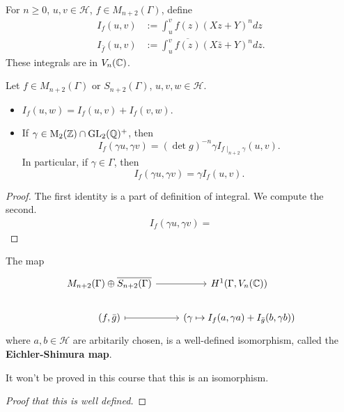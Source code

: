 \begin{definition}
    For $n\ge 0$, $u, v\in \mathcal{H}$, $f\in M_{n+2}(\Gamma)$,
    define \begin{align*}
        I_f(u, v) &:= \int_u^v f(z) (Xz + Y)^n dz\\
        I_{\bar{f}}(u, v) &:=
        \int_u^v \overline{f(z)}(X\bar{z} + Y)^n dz.
    \end{align*}
    These integrals are in $V_n(\mathbb{C})$.
\end{definition}
\begin{lemma}\label{lem: property of If(u v)}
    Let $f\in M_{n+2}(\Gamma)$ or $S_{n+2}(\Gamma)$, $u, v, w\in\mathcal{H}$.\begin{itemize}
        \item $I_f(u, w) = I_f(u, v) + I_f(v, w)$.
        \item If $\gamma\in \mathrm{M}_2(\mathbb{Z})\cap\operatorname{GL}_2(\mathbb{Q})^+$,
        then \[I_f(\gamma u, \gamma v) = \left( \det g \right)^{-n}\gamma I_{f\mid_{n+2}\gamma}(u, v).\]
        In particular, if $\gamma\in\Gamma$, then \[I_f(\gamma u, \gamma v) = \gamma I_f(u, v).\]
    \end{itemize}
\end{lemma}
\begin{proof}
    The first identity is a part of definition of integral.
    We compute the second.
    \begin{align*}
        I_f(\gamma u, \gamma v) = 
    \end{align*}
\end{proof}

\begin{theorem}
    The map
\[\begin{tikzcd}
	{M_{n+2}(\Gamma)\oplus \overline{S_{n+2}(\Gamma)}} & {H^1(\Gamma, V_n(\C))} \\
	{(f, \bar{g})} & {\left( \gamma\mapsto I_f(a, \gamma a) + I_{\bar{g}}(b, \gamma b) \right)}
	\arrow[from=1-1, to=1-2]
	\arrow[maps to, from=2-1, to=2-2]
\end{tikzcd}\]
where $a, b\in\mathcal{H}$ are arbitarily chosen, is a well-defined isomorphism, called the \textbf{Eichler-Shimura map}.
\end{theorem}
It won't be proved in this course that this is an isomorphism.
\begin{proof}
    [Proof that this is well defined]
\end{proof}

















